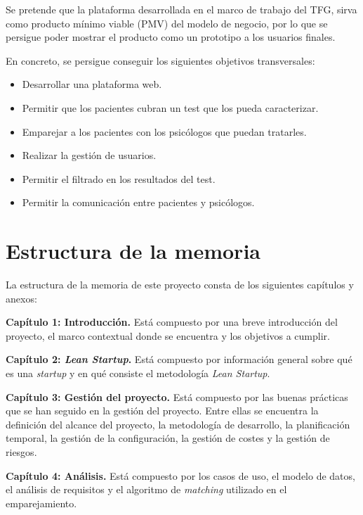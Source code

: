 Se pretende que la plataforma desarrollada en el marco de trabajo del TFG, sirva como producto mínimo viable (PMV) del modelo de negocio, por lo que se persigue poder mostrar el producto como un prototipo a los usuarios finales. 


En concreto, se persigue conseguir los siguientes objetivos transversales:


\begin{itemize}
\item Desarrollar una plataforma web.
\item Permitir que los pacientes cubran un test que los pueda caracterizar.
\item Emparejar a los pacientes con los psicólogos que puedan tratarles.
\item Realizar la gestión de usuarios.
\item Permitir el filtrado en los resultados del test.
\item Permitir la comunicación entre pacientes y psicólogos.
\end{itemize}


\section{Estructura de la memoria}
La estructura de la memoria de este proyecto consta de los siguientes capítulos y anexos:\newline


\textbf{Capítulo 1: Introducción.} Está compuesto por una breve introducción del proyecto, el marco contextual donde se encuentra y los objetivos a cumplir.\newline


\textbf{Capítulo 2: \textit{Lean Startup}.} Está compuesto por información general sobre qué es una \textit{startup} y en qué consiste el metodología \textit{Lean Startup}.\newline


\textbf{Capítulo 3: Gestión del proyecto.} Está compuesto por las buenas prácticas que se han seguido en la gestión del proyecto. Entre ellas se encuentra la definición del alcance del proyecto, la metodología de desarrollo, la planificación temporal, la gestión de la configuración, la gestión de costes y la gestión de riesgos.\newline


\textbf{Capítulo 4: Análisis.} Está compuesto por los casos de uso, el modelo de datos, el análisis de requisitos y el algoritmo de \textit{matching} utilizado en el emparejamiento.\newline


